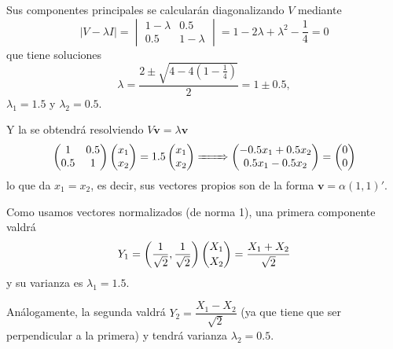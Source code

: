 Sus componentes principales se calcularán diagonalizando $V$ mediante \[ \left|V-\lambda I\right|=\begin{vmatrix}
	1-\lambda & 0.5\\
	0.5 & 1-\lambda
\end{vmatrix}=1-2\lambda+\lambda^2-\dfrac{1}{4}=0 \] que tiene soluciones \[ \lambda=\dfrac{2\pm\sqrt{4-4(1-\frac{1}{4})}}{2}=1\pm0.5, \]$\lambda_1=1.5$ y $\lambda_2=0.5$.

Y la  se obtendrá resolviendo $V\mathbf{v}=\lambda\mathbf{v}$ \[ \begin{pmatrix}
	1 & 0.5\\
	0.5 & 1
\end{pmatrix}\begin{pmatrix}
x_1\\
x_2
\end{pmatrix}=1.5\begin{pmatrix}
x_1\\
x_2
\end{pmatrix}\xRightarrow{\qquad}\begin{pmatrix}
-0.5x_1+0.5x_2\\
0.5x_1-0.5x_2
\end{pmatrix}=\begin{pmatrix}
0\\
0
\end{pmatrix} \]lo que da $x_1=x_2$, es decir, sus vectores propios son de la forma $\mathbf{v}=\alpha(1,1)'$.

Como usamos vectores normalizados (de norma 1), una primera componente valdrá \[ Y_1=\left(\dfrac{1}{\sqrt{2}},\dfrac{1}{\sqrt{2}}\right)\dbinom{X_1}{X_2}=\dfrac{X_1+X_2}{\sqrt{2}} \]y su varianza es $\lambda_1=1.5$.

Análogamente, la segunda valdrá $Y_2=\dfrac{X_1-X_2}{\sqrt{2}}$ (ya que tiene que ser perpendicular a la primera) y tendrá varianza $\lambda_2=0.5$.

